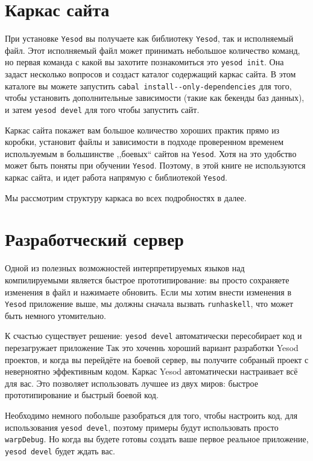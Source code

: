 \section{Каркас сайта}

При установке \texttt{Yesod} вы получаете как библиотеку \texttt{Yesod}, 
так и исполняемый файл. Этот исполняемый файл может принимать небольшое 
количество команд, но первая команда с какой вы захотите познакомиться 
это \texttt{yesod init}. Она задаст несколько вопросов и создаст каталог 
содержащий каркас сайта. В этом каталоге
вы можете запустить \lstinline'cabal install--only-dependencies' для того, чтобы установить дополнительные
зависимости (такие как бекенды баз данных), и затем \lstinline'yesod devel' для того чтобы запустить сайт.

Каркас сайта покажет вам большое количество хороших практик прямо 
из коробки, установит файлы и зависимости в подходе проверенном временем используемым в большинстве ,,боевых`` сайтов на \texttt{Yesod}.
Хотя на это удобство может быть поняты при обучении  \texttt{Yesod}.
Поэтому, в этой книге не используются каркас сайта, 
и идет работа напрямую с библиотекой \texttt{Yesod}.

Мы рассмотрим структуру каркаса во всех подробностях в далее.

\section{Разработческий сервер}

Одной из полезных возможностей интерпретируемых языков над компилируемыми является быстрое прототипирование: 
вы просто сохраняете изменения в файл и нажимаете обновить. 
Если мы хотим внести изменения в \texttt{Yesod} приложение выше, 
мы должны сначала вызвать \lstinline!runhaskell!, что может быть немного 
утомительно.

К счастью существует решение: \lstinline'yesod devel' автоматически 
пересобирает код и перезагружает приложение Так это хоченнь хороший вариант
разработки Yesod проектов, и когда вы перейдёте на боевой сервер,
вы получите собраный проект с неверноятно эффективным кодом. Каркас Yesod автоматически
настраивает всё для вас. Это позволяет использовать лучшее из двух миров: 
быстрое прототипирование и быстрый боевой код.

Необходимо немного побольше разобраться для того, чтобы настроить код, 
для использования \lstinline!yesod devel!, поэтому примеры будут 
использовать просто \lstinline!warpDebug!. Но когда вы будете готовы
создать ваше первое реальное приложение, \lstinline'yesod devel' будет ждать вас.

